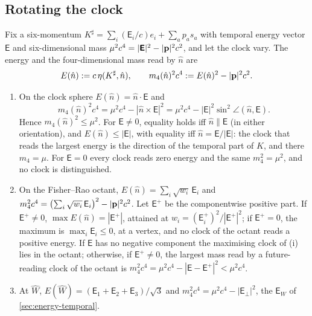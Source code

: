 \subsection{Rotating the clock}
\label{r2:sec:rotate}

Fix a six-momentum $K^\sharp=\sum_i(\mathsf E_i/c)e_i+\sum_ap_as_a$ with temporal energy vector $\boldsymbol{\mathsf E}$ and six-dimensional mass
$\mu^2c^4=|\boldsymbol{\mathsf E}|^2-|\mathbf p|^2c^2$, and let the clock vary. The energy and the four-dimensional mass read by $\hat n$ are
\[
E(\hat n):=c\,\eta(K^\sharp,\hat n),\qquad m_4(\hat n)^2c^4:=E(\hat n)^2-|\mathbf p|^2c^2 .
\]

\begin{proposition}
\label{r2:prop:rotate}
\begin{enumerate}[label=(\roman*),leftmargin=2.2em]
\item On the clock sphere $E(\hat n)=\hat n\cdot\boldsymbol{\mathsf E}$ and
\[
m_4(\hat n)^2c^4=\mu^2c^4-|\hat n\times\boldsymbol{\mathsf E}|^2=\mu^2c^4-|\boldsymbol{\mathsf E}|^2\sin^2\angle(\hat n,\boldsymbol{\mathsf E}) .
\]
Hence $m_4(\hat n)^2\le\mu^2$. For $\boldsymbol{\mathsf E}\neq0$, equality holds iff $\hat n\parallel\boldsymbol{\mathsf E}$ (in either orientation), and $E(\hat n)\le|\boldsymbol{\mathsf E}|$, with equality iff
$\hat n=\boldsymbol{\mathsf E}/|\boldsymbol{\mathsf E}|$: the clock that reads the largest energy is the direction of the temporal part of $K$, and there $m_4=\mu$. For $\boldsymbol{\mathsf E}=0$ every clock reads
zero energy and the same $m_4^2=\mu^2$, and no clock is distinguished.
\item On the Fisher--Rao octant, $E(\hat n)=\sum_i\sqrt{w_i}\,\mathsf E_i$ and $m_4^2c^4=\bigl(\sum_i\sqrt{w_i}\,\mathsf E_i\bigr)^2-|\mathbf p|^2c^2$. Let
$\boldsymbol{\mathsf E}^+$ be the componentwise positive part. If $\boldsymbol{\mathsf E}^+\neq0$, $\max E(\hat n)=|\boldsymbol{\mathsf E}^+|$, attained at
$w_i=(\mathsf E_i^+)^2/|\boldsymbol{\mathsf E}^+|^2$; if $\boldsymbol{\mathsf E}^+=0$, the maximum is $\max_i\mathsf E_i\le0$, at a vertex, and no clock of the
octant reads a positive energy. If $\boldsymbol{\mathsf E}$ has no negative component the maximising clock of (i) lies in the octant; otherwise, if $\boldsymbol{\mathsf E}^+\neq0$, the largest mass read by a future-reading
clock of the octant is $m_4^2c^4=\mu^2c^4-|\boldsymbol{\mathsf E}-\boldsymbol{\mathsf E}^+|^2<\mu^2c^4$.
\item At $\widehat W$, $E(\widehat W)=(\mathsf E_1+\mathsf E_2+\mathsf E_3)/\sqrt3$ and $m_4^2c^4=\mu^2c^4-|\boldsymbol{\mathsf E}_\perp|^2$, the $\mathsf E_W$ of \cref{sec:energy-temporal}.
\end{enumerate}
\end{proposition}

